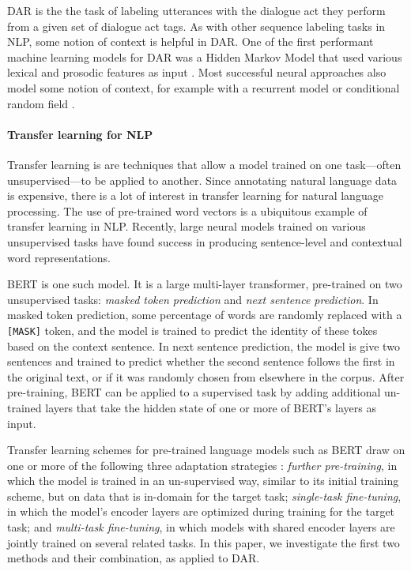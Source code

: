 \documentclass[11pt,a4paper]{article}
\begin{document}
DAR is the the task of labeling utterances with the dialogue act they perform 
from a given set of dialogue act tags.
As with other sequence labeling tasks in NLP, some notion of context is helpful in DAR.
One of the first performant machine learning models for DAR was a Hidden Markov Model that used various lexical and prosodic features as input \citep{stolckeDialogueActModeling2000}.
Most successful neural approaches also model some notion of context, 
for example with a recurrent model \citep[e.g.,][]{botheContextbasedApproachDialogue2018} or conditional random field \citep[e.g.,][]{chenDialogueActRecognition2017}.

\paragraph{Transfer learning for NLP}
Transfer learning is are techniques that allow a model trained on one task---often unsupervised---to be applied to another. 
Since annotating natural language data is expensive, there is a lot of interest in transfer learning for natural language processing. 
The use of pre-trained word vectors \citep[e.g.,][]{mikolovDistributedRepresentationsWords2013;penningtonGloveGlobalVectors2014} is a ubiquitous example of transfer learning in NLP.
Recently, large neural models trained on various unsupervised tasks have found success in producing sentence-level and contextual word representations. 

BERT \citep{devlinBERTPretrainingDeep2018} is one such model. 
It is a large multi-layer transformer, pre-trained on two unsupervised tasks: \emph{masked token prediction} and \emph{next sentence prediction}.
In masked token prediction, some percentage of words are randomly replaced with a \texttt{[MASK]} token, and the model is trained to predict the identity of these tokes based on the context sentence.
In next sentence prediction, the model is give two sentences and trained to predict whether the second sentence follows the first in the original text, or if it was randomly chosen from elsewhere in the corpus.
After pre-training, BERT can be applied to a supervised task by adding additional un-trained layers that take the hidden state of one or more of BERT's layers as input. 

Transfer learning schemes for pre-trained language models such as BERT draw on one or more of the following three adaptation strategies \citet{sunHowFineTuneBERT2019}:
\emph{further pre-training}, in which the model is trained in an un-supervised way, similar to its initial training scheme, but on data that is in-domain for the target task; 
\emph{single-task fine-tuning}, in which the model's encoder layers are optimized during training for the target task;
and \emph{multi-task fine-tuning}, in which models with shared encoder layers are jointly trained on several related tasks.
In this paper, we investigate the first two methods and their combination, as applied to DAR.
\end{document}
